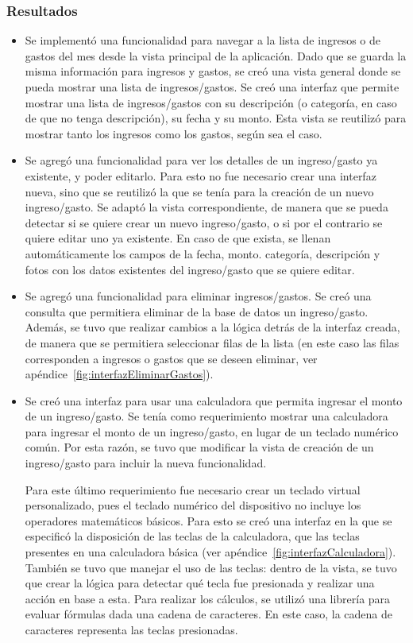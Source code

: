 \subsubsection{Resultados}
\begin{itemize}
\item Se implementó una funcionalidad para navegar a la lista de ingresos o de gastos del mes desde la vista principal de la aplicación. Dado que se guarda la misma información para ingresos y gastos, se creó una vista general donde se pueda mostrar una lista de ingresos/gastos. Se creó una interfaz que permite mostrar una lista de ingresos/gastos con su descripción (o categoría, en caso de que no tenga descripción), su fecha y su monto. Esta vista se reutilizó para mostrar tanto los ingresos como los gastos, según sea el caso.
\item Se agregó una funcionalidad para ver los detalles de un ingreso/gasto ya existente, y poder editarlo. Para esto no fue necesario crear una interfaz nueva, sino que se reutilizó la que se tenía para la creación de un nuevo ingreso/gasto. Se adaptó la vista correspondiente, de manera que se pueda detectar si se quiere crear un nuevo ingreso/gasto, o si por el contrario se quiere editar uno ya existente. En caso de que exista, se llenan automáticamente los campos de la fecha, monto. categoría, descripción y fotos con los datos existentes del ingreso/gasto que se quiere editar.
\item Se agregó una funcionalidad para eliminar ingresos/gastos. Se creó una consulta que permitiera eliminar de la base de datos un ingreso/gasto. Además, se tuvo que realizar cambios a la lógica detrás de la interfaz creada, de manera que se permitiera seleccionar filas de la lista (en este caso las filas corresponden a ingresos o gastos que se deseen eliminar, ver apéndice~\ref{fig:interfazEliminarGastos}). 
\item Se creó una interfaz para usar una calculadora que permita ingresar el monto de un ingreso/gasto. 
Se tenía como requerimiento mostrar una calculadora para ingresar el monto de un ingreso/gasto, en lugar de un teclado numérico común. Por esta razón, se tuvo que modificar la vista de creación de un ingreso/gasto para incluir la nueva funcionalidad. 

Para este último requerimiento fue necesario crear un teclado virtual personalizado, pues el teclado numérico del dispositivo no incluye los operadores matemáticos básicos. Para esto se creó una interfaz en la que se especificó la disposición de las teclas de la calculadora, que las teclas presentes en una calculadora básica (ver apéndice~\ref{fig:interfazCalculadora}). También se tuvo que manejar el uso de las teclas: dentro de la vista, se tuvo que crear la lógica para detectar qué tecla fue presionada y realizar una acción en base a esta. Para realizar los cálculos, se utilizó una librería para evaluar fórmulas dada una cadena de caracteres. En este caso, la cadena de caracteres representa las teclas presionadas.


\end{itemize}
